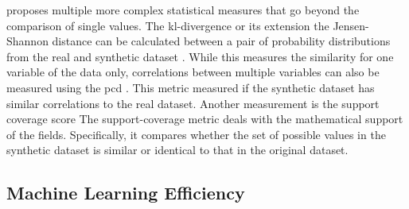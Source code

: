 \cite{goncalves2020GenerationEvaluationSynthetic} proposes multiple more complex statistical measures that go beyond the comparison of single values.
The \gls{kl}-divergence or its extension the Jensen-Shannon distance \cite{zhao2022CTABGANEnhancingTabular} can be calculated between a pair of probability distributions from the real and synthetic dataset \cite{goncalves2020GenerationEvaluationSynthetic, li2022TTSGANTransformerbasedTimeSeries}.
While this measures the similarity for one variable of the data only, correlations between multiple variables can also be measured using the \gls{pcd} \cite{goncalves2020GenerationEvaluationSynthetic}.
This metric measured if the synthetic dataset has similar correlations to the real dataset.
Another measurement is the support coverage score \cite{goncalves2020GenerationEvaluationSynthetic}
The support-coverage metric deals with the mathematical support of the fields. 
Specifically, it compares whether the set of possible values in the synthetic dataset is similar or identical to that in the original dataset.

\subsection{Machine Learning Efficiency}
\label{ch:preliminaries-machineLearningEfficiency}

